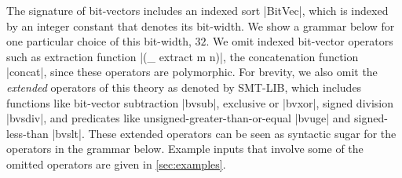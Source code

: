 \documentclass[english,a4paper,10pt]{article}
\begin{document}
\begin{appendix}
The signature of bit-vectors includes an indexed sort \code|BitVec|,
which is indexed by an integer constant that denotes its bit-width.
We show a grammar below for one particular choice of this bit-width, $32$.
We omit indexed bit-vector operators
such as extraction function \code|(_ extract m n)|,
the concatenation function \code|concat|,
since these operators are polymorphic.
For brevity,
we also omit the \emph{extended} operators of this theory
as denoted by SMT-LIB,
which includes functions like
bit-vector subtraction \code|bvsub|,
exclusive or \code|bvxor|,
signed division \code|bvsdiv|,
and predicates like
unsigned-greater-than-or-equal \code|bvuge|
and signed-less-than \code|bvslt|.
These extended operators can be seen as syntactic sugar for the
operators in the grammar below.
Example inputs that involve 
some of the omitted operators are given in \cref{sec:examples}.


\end{appendix}
\end{document}
